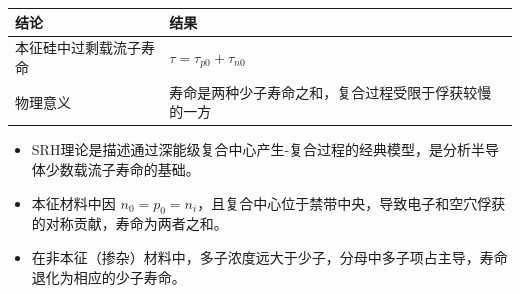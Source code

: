 \begin{formulabox}[答案汇总]
\begin{center}
\begin{tabular}{ll}
\toprule
\textbf{结论} & \textbf{结果} \\
\midrule
本征硅中过剩载流子寿命 & $\tau=\tau_{p0}+\tau_{n0}$ \\
物理意义 & 寿命是两种少子寿命之和，复合过程受限于俘获较慢的一方 \\
\bottomrule
\end{tabular}
\end{center}
\end{formulabox}

\begin{insightbox}[物理图像]
\begin{itemize}
    \item SRH理论是描述通过深能级复合中心产生-复合过程的经典模型，是分析半导体少数载流子寿命的基础。
    \item 本征材料中因 $n_0=p_0=n_i$，且复合中心位于禁带中央，导致电子和空穴俘获的对称贡献，寿命为两者之和。
    \item 在非本征（掺杂）材料中，多子浓度远大于少子，分母中多子项占主导，寿命退化为相应的少子寿命。
\end{itemize}
\end{insightbox}
